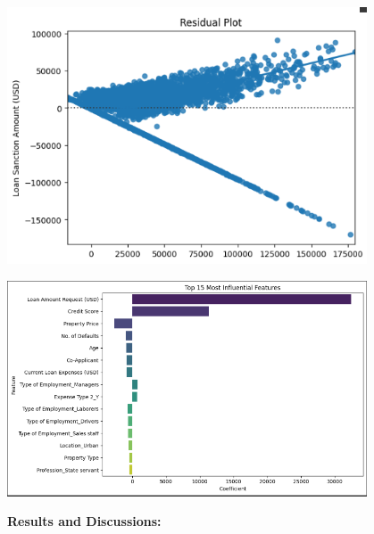 \documentclass[11pt]{article}
\begin{document}
\begin{center}
  \includegraphics[width=0.8\textwidth]{sc6.png}
\end{center}
\begin{center}
  \includegraphics[width=0.8\textwidth]{sc7.png}
\end{center}

\vspace{0.5cm}
\noindent
\textbf{\large Results and Discussions:} 

\vspace{0.5cm}
\noindent



\vspace{0.5cm}
\noindent
\end{document}
